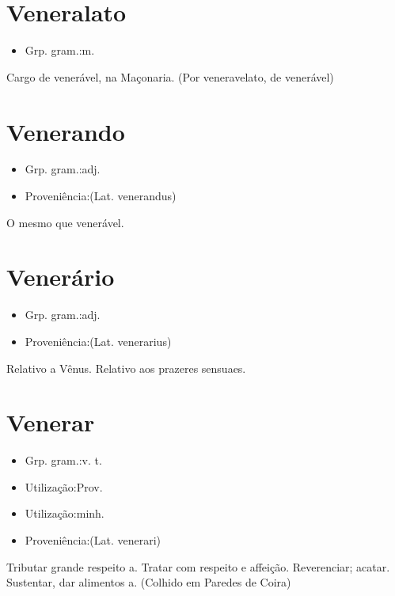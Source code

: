 \documentclass{article}
\begin{document}
\section{Veneralato}
\begin{itemize}
\item {Grp. gram.:m.}
\end{itemize}
Cargo de venerável, na Maçonaria.
(Por \textunderscore veneravelato\textunderscore , de \textunderscore venerável\textunderscore )
\section{Venerando}
\begin{itemize}
\item {Grp. gram.:adj.}
\end{itemize}
\begin{itemize}
\item {Proveniência:(Lat. \textunderscore venerandus\textunderscore )}
\end{itemize}
O mesmo que \textunderscore venerável\textunderscore .
\section{Venerário}
\begin{itemize}
\item {Grp. gram.:adj.}
\end{itemize}
\begin{itemize}
\item {Proveniência:(Lat. \textunderscore venerarius\textunderscore )}
\end{itemize}
Relativo a Vênus.
Relativo aos prazeres sensuaes.
\section{Venerar}
\begin{itemize}
\item {Grp. gram.:v. t.}
\end{itemize}
\begin{itemize}
\item {Utilização:Prov.}
\end{itemize}
\begin{itemize}
\item {Utilização:minh.}
\end{itemize}
\begin{itemize}
\item {Proveniência:(Lat. \textunderscore venerari\textunderscore )}
\end{itemize}
Tributar grande respeito a.
Tratar com respeito e affeição.
Reverenciar; acatar.
Sustentar, dar alimentos a. (Colhido em Paredes de Coira)
\end{document}
